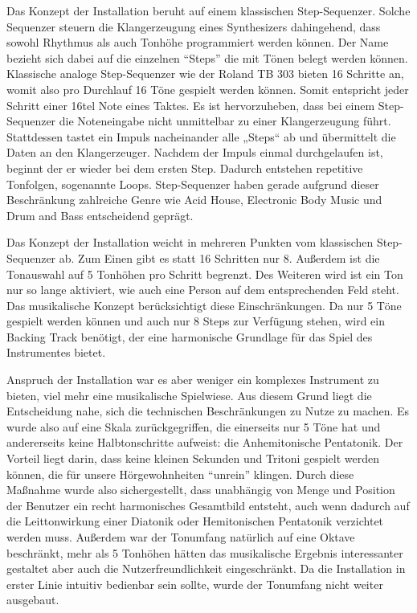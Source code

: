 \label{sec:music}

Das Konzept der Installation beruht auf einem klassischen Step-Sequenzer. Solche Sequenzer steuern die Klangerzeugung eines Synthesizers dahingehend, dass sowohl Rhythmus als auch Tonhöhe programmiert werden können. Der Name bezieht sich dabei auf die einzelnen \enquote{Steps} die mit Tönen belegt werden können. Klassische analoge Step-Sequenzer wie der Roland TB 303 bieten 16 Schritte an, womit also pro Durchlauf 16 Töne gespielt werden können. Somit entspricht jeder Schritt einer 16tel Note eines Taktes. Es ist hervorzuheben, dass bei einem Step-Sequenzer die Noteneingabe nicht unmittelbar zu einer Klangerzeugung führt. Stattdessen tastet ein Impuls nacheinander alle „Steps“ ab und übermittelt die Daten an den Klangerzeuger. Nachdem der Impuls einmal durchgelaufen ist, beginnt der er wieder bei dem ersten Step. Dadurch entstehen repetitive Tonfolgen, sogenannte Loops. Step-Sequenzer haben gerade aufgrund dieser Beschränkung zahlreiche Genre wie Acid House, Electronic Body Music und Drum and Bass entscheidend geprägt.

Das Konzept der Installation weicht in mehreren Punkten vom klassischen Step-Sequenzer ab. Zum Einen gibt es statt 16 Schritten nur 8. Außerdem ist die Tonauswahl auf 5 Tonhöhen pro Schritt begrenzt. Des Weiteren wird ist ein Ton nur so lange aktiviert, wie auch eine Person auf dem entsprechenden Feld steht. Das musikalische Konzept berücksichtigt diese Einschränkungen. Da nur 5 Töne gespielt werden können und auch nur 8 Steps zur Verfügung stehen, wird ein Backing Track benötigt, der eine harmonische Grundlage für das Spiel des Instrumentes bietet.

Anspruch der Installation war es aber weniger ein komplexes Instrument zu bieten, viel mehr eine musikalische Spielwiese. Aus diesem Grund liegt die Entscheidung nahe, sich die technischen Beschränkungen zu Nutze zu machen. Es wurde also auf eine Skala zurückgegriffen, die einerseits nur 5 Töne hat und andererseits keine Halbtonschritte aufweist: die Anhemitonische Pentatonik. Der Vorteil liegt darin, dass keine kleinen Sekunden und Tritoni gespielt werden können, die für unsere Hörgewohnheiten \enquote{unrein} klingen. Durch diese Maßnahme wurde also sichergestellt, dass unabhängig von Menge und Position der Benutzer ein recht harmonisches Gesamtbild entsteht, auch wenn dadurch auf die Leittonwirkung einer Diatonik oder Hemitonischen Pentatonik verzichtet werden muss. Außerdem war der Tonumfang natürlich auf eine Oktave beschränkt, mehr als 5 Tonhöhen hätten das musikalische Ergebnis interessanter gestaltet aber auch die Nutzerfreundlichkeit eingeschränkt. Da die Installation in erster Linie intuitiv bedienbar sein sollte, wurde der Tonumfang nicht weiter ausgebaut.

